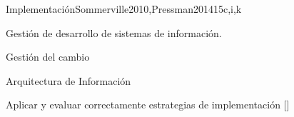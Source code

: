 \begin{syllabus}
\begin{unit}{Implementación}{}{Sommerville2010,Pressman2014}{15}{c,i,k}
\begin{topics}
    \item Gestión de desarrollo de sistemas de información.
    \item Gestión del cambio
    \item Arquitectura de Información
\end{topics}
\begin{learningoutcomes}
    \item Aplicar y evaluar correctamente estrategias de implementación [\Assessment]
\end{learningoutcomes}
\end{unit}

\begin{coursebibliography}
\end{coursebibliography}

\end{syllabus}
